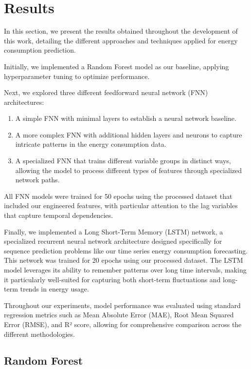\section{Results}

In this section, we present the results obtained throughout the development of this work, detailing the different approaches and techniques applied for energy consumption prediction.

Initially, we implemented a Random Forest model as our baseline, applying hyperparameter tuning to optimize performance.

Next, we explored three different feedforward neural network (FNN) architectures:
\begin{enumerate}
\item A simple FNN with minimal layers to establish a neural network baseline.
\item A more complex FNN with additional hidden layers and neurons to capture intricate patterns in the energy consumption data.
\item A specialized FNN that trains different variable groups in distinct ways, allowing the model to process different types of features through specialized network paths.
\end{enumerate}

All FNN models were trained for 50 epochs using the processed dataset that included our engineered features, with particular attention to the lag variables that capture temporal dependencies.

Finally, we implemented a Long Short-Term Memory (LSTM) network, a specialized recurrent neural network architecture designed specifically for sequence prediction problems like our time series energy consumption forecasting. This network was trained for 20 epochs using our processed dataset. The LSTM model leverages its ability to remember patterns over long time intervals, making it particularly well-suited for capturing both short-term fluctuations and long-term trends in energy usage. 

Throughout our experiments, model performance was evaluated using standard regression metrics such as Mean Absolute Error (MAE), Root Mean Squared Error (RMSE), and R² score, allowing for comprehensive comparison across the different methodologies.

\subsection{Random Forest}

